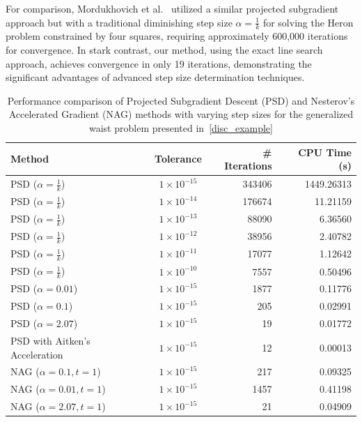 \documentclass[12pt]{article}
\theoremstyle{plain}
\theoremstyle{definition}
\begin{document}
For comparison, Mordukhovich et al.~\cite{MoNaSa12} utilized a similar projected subgradient approach but with a traditional diminishing step size \( \alpha = \frac{1}{k} \) for solving the Heron problem constrained by four squares, requiring approximately 600,000 iterations for convergence. In stark contrast, our method, using the exact line search approach, achieves convergence in only 19 iterations, demonstrating the significant advantages of advanced step size determination techniques.
\begin{table}[htbp]
	\centering
	
	\begin{tabular}{l c r r}
		\toprule
		\textbf{Method} & \textbf{Tolerance} & \textbf{\# Iterations} & \textbf{CPU Time (s)} \\
		\midrule
		PSD ($\alpha = \frac{1}{k}$)                & $1\times 10^{-15}$ & 343406 & 1449.26313 \\
		PSD ($\alpha = \frac{1}{k}$)                & $1\times 10^{-14}$ & 176674 &   11.21159 \\
		PSD ($\alpha =\frac{1}{k}$)                & $1\times 10^{-13}$ &  88090 &    6.36560 \\
		PSD ($\alpha = \frac{1}{k}$)                & $1\times 10^{-12}$ &  38956 &    2.40782 \\
		PSD ($\alpha = \frac{1}{k}$)                & $1\times 10^{-11}$ &  17077 &    1.12642 \\
		PSD ($\alpha = \frac{1}{k}$)                & $1\times 10^{-10}$ &   7557 &    0.50496 \\
		PSD ($\alpha = 0.01$)             & $1\times 10^{-15}$ &   1877 &    0.11776 \\
		PSD ($\alpha = 0.1$)              & $1\times 10^{-15}$ &    205 &    0.02991 \\
		PSD ($\alpha = 2.07$)             & $1\times 10^{-15}$ &     19 &    0.01772 \\
		PSD with Aitken's Acceleration    & $1\times 10^{-15}$ &     12 &    0.00013 \\
		\midrule
		NAG ($\alpha = 0.1, t = 1$)       & $1\times 10^{-15}$ &    217 &    0.09325 \\
		NAG ($\alpha = 0.01, t = 1$)      & $1\times 10^{-15}$ &   1457 &    0.41198 \\
		NAG ($\alpha = 2.07, t = 1$)      & $1\times 10^{-15}$ &     21 &    0.04909 \\
		\bottomrule
	\end{tabular}
	\caption{Performance comparison of Projected Subgradient Descent (PSD) and Nesterov’s Accelerated Gradient (NAG) methods with varying step sizes for the generalized waist problem presented in~\ref{disc_example}}
	\label{tab:psd-nag-comparison-disc}
\end{table}
\end{document}
